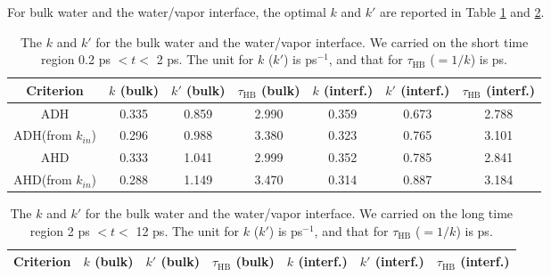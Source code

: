 {\begin{equation}
\end{equation}
For bulk water and the water/vapor interface, the optimal $k$ and $k'$ are reported in Table 
\ref{tab:k_k_prime_128w_pure_1} and \ref{tab:k_k_prime_128w_pure_2}. 
% 
\begin{table}[htb]
\centering
\caption{\label{tab:k_k_prime_128w_pure_1} 
    The $k$ and $k'$ for the bulk water and the water/vapor interface. We carried on the short time region 0.2 ps $< t <$ 2 ps. 
The unit for $k$ ($k'$) is ps$^{-1}$, and that for $\tau_{\text{HB}}$ ($=1/k$) is ps.} 
\begin{tabular}{ccccccc}
 Criterion & $k$  (bulk) & $k'$ (bulk) & $\tau_{\text{HB}}$ (bulk) & $k$  (interf.) & $k'$ (interf.) & $\tau_{\text{HB}}$ (interf.)\\
\hline
  ADH & 0.335 & 0.859 & 2.990 & 0.359 & 0.673 & 2.788  \\
  ADH(from $k_{in}$) & 0.296  & 0.988 & 3.380  & 0.323 & 0.765 & 3.101 \\
  AHD & 0.333 & 1.041 & 2.999 & 0.352  & 0.785  &  2.841\\
  AHD(from $k_{in}$) & 0.288 & 1.149 & 3.470 & 0.314 & 0.887 & 3.184 \\
\end{tabular}
\end{table}
%
\begin{table}[htb]
\centering
\caption{\label{tab:k_k_prime_128w_pure_2} 
    The $k$ and $k'$ for the bulk water and the water/vapor interface. We carried on the long time region 2 ps $< t <$ 12 ps. 
The unit for $k$ ($k'$) is ps$^{-1}$, and that for $\tau_{\text{HB}}$ ($=1/k$) is ps.} 
\begin{tabular}{ccccccc}
 Criterion & $k$  (bulk) & $k'$ (bulk) & $\tau_{\text{HB}}$ (bulk) & $k$  (interf.) & $k'$ (interf.) & $\tau_{\text{HB}}$ (interf.)\\
\hline

\end{tabular}
\end{table}}
